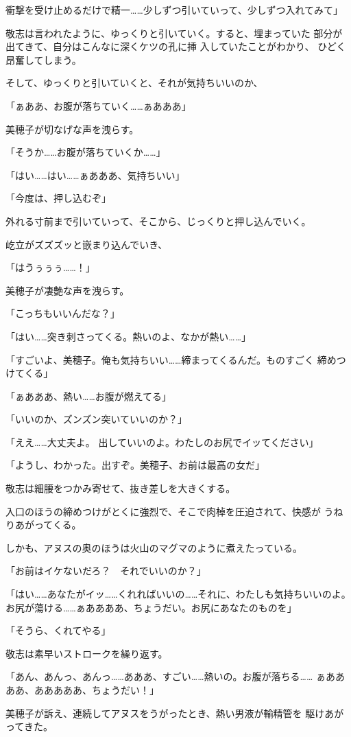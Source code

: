 ﻿\documentclass[
    book,tate,
    line_length=30zw,
    jafontsize=12pt,
    paper=b5j,
    landscape,
    ]{jlreq}
\begin{document}
衝撃を受け止めるだけで精一……少しずつ引いていって、少しずつ入れてみて」

敬志は言われたように、ゆっくりと引いていく。すると、埋まっていた
部分が出てきて、自分はこんなに深くケツの孔に挿 入していたことがわかり、
ひどく昂奮してしまう。

そして、ゆっくりと引いていくと、それが気持ちいいのか、

「ぁああ、お腹が落ちていく……ぁあああ」

美穂子が切なげな声を洩らす。

「そうか……お腹が落ちていくか……」

「はい……はい……ぁあああ、気持ちいい」

「今度は、押し込むぞ」

外れる寸前まで引いていって、そこから、じっくりと押し込んでいく。

屹立がズズズッと嵌まり込んでいき、

「はうぅぅぅ……！」

美穂子が凄艶な声を洩らす。

「こっちもいいんだな？」

「はい……突き刺さってくる。熱いのよ、なかが熱い……」

「すごいよ、美穂子。俺も気持ちいい……締まってくるんだ。ものすごく
締めつけてくる」

「ぁあああ、熱い……お腹が燃えてる」

「いいのか、ズンズン突いていいのか？」

「ええ……大丈夫よ。 出していいのよ。わたしのお尻でイッてください」


「ようし、わかった。出すぞ。美穂子、お前は最高の女だ」

敬志は細腰をつかみ寄せて、抜き差しを大きくする。

入口のほうの締めつけがとくに強烈で、そこで肉棹を圧迫されて、快感が
うねりあがってくる。

しかも、アヌスの奥のほうは火山のマグマのように煮えたっている。

「お前はイケないだろ？　それでいいのか？」

「はい……あなたがイッ……くれればいいの……それに、わたしも気持ちいいのよ。
お尻が蕩ける……ぁああああ、ちょうだい。お尻にあなたのものを」

「そうら、くれてやる」

敬志は素早いストロークを繰り返す。

「あん、あんっ、あんっ……あああ、すごい……熱いの。お腹が落ちる……
ぁああああ、あああああ、ちょうだい！」

美穂子が訴え、連続してアヌスをうがったとき、熱い男液が輸精管を
駆けあがってきた。
\end{document}
